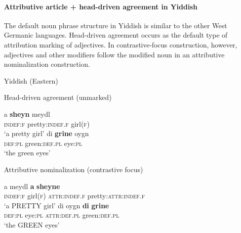 \paragraph{Attributive article + head-driven agreement in Yiddish} \label{yiddish synchr}
The default noun phrase structure in Yiddish is similar to the other West Germanic languages. Head-driven agreement occurs as the default type of attribution marking of adjectives. In contrastive-focus construction, however, adjectives and other modifiers follow the modified noun in an attributive nominalization construction.
\begin{exe}
\ex \rm{Yiddish (Eastern) \citep[96]{jacobs-etal1994}}
\begin{xlist}
\ex \rm{Head-driven agreement (unmarked)}
\begin{xlist}
\ex 
\gll	a \textbf{sheyn} meydl\\
	\textsc{indef:f} pretty:\textsc{indef.f} girl\textsc{(f)}\\
\glt	‘a pretty girl’
\ex
\gll	di \textbf{grine} oygn\\
	\textsc{def:pl} green:\textsc{def.pl} eye:\textsc{pl}\\
\glt	‘the green eyes’
\end{xlist}
\ex \rm{Attributive nominalization (contrastive focus)}
\begin{xlist}
\ex
\gll	a meydl \textbf{a} \textbf{sheyne}\\
	\textsc{indef:f} girl\textsc{(f)} \textsc{attr:indef.f} pretty:\textsc{attr:indef.f}\\
\glt	‘a PRETTY girl’
\ex
\gll	di oygn \textbf{di} \textbf{grine}\\
	\textsc{def:pl} eye:\textsc{pl} \textsc{attr:def.pl} green:\textsc{def.pl} \\
\glt	‘the GREEN eyes’
\end{xlist}
\end{xlist}
\end{exe}


